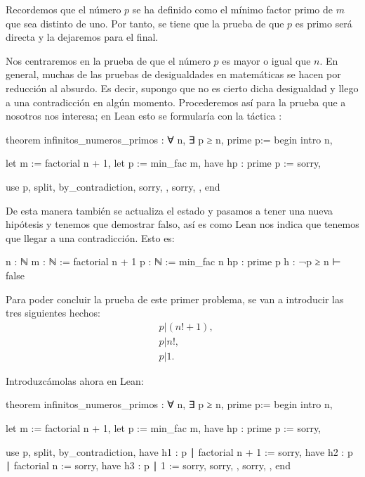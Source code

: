 Recordemos que el número \(p\) se ha definido como el mínimo factor primo de
\(m\) que sea distinto de uno. Por tanto, se tiene que la prueba de que \(p\)
es primo será directa y la dejaremos para el final.

Nos centraremos en la prueba de que el número \(p\) es mayor o igual que
\(n\). En general, muchas de las pruebas de desigualdades en
matemáticas se hacen por reducción al absurdo. Es decir, supongo que no
es cierto dicha desigualdad y llego a una contradicción en algún
momento. Procederemos así para la prueba que a nosotros nos interesa; en
Lean esto se formularía con la táctica
:
\begin{leancode}
theorem infinitos_numeros_primos : ∀ n, ∃ p ≥ n, prime p:=
begin
  intro n,

  let m := factorial n + 1,
  let p := min_fac m,
  have hp : prime p := sorry,

  use p,
  split,
  { by_contradiction,
    sorry, },
  { sorry, },
end
\end{leancode}

De esta manera también se actualiza el estado y pasamos a tener una
nueva hipótesis y tenemos que demostrar falso, así es como Lean nos
indica que tenemos que llegar a una contradicción. Esto es:
\begin{leancode}
n : ℕ
m : ℕ := factorial n + 1
p : ℕ := min_fac n
hp : prime p
h : ¬p ≥ n
⊢ false
\end{leancode}

Para poder concluir la prueba de este primer problema, se van a introducir
las tres siguientes hechos:
\begin{align}
  &p | (n!+1),\tag{h1}\label{h1intro}\\
  &p | n!,    \tag{h2}\label{h2intro}\\
  &p | 1.     \tag{h3}\label{h3intro}
\end{align}

Introduzcámolas ahora en Lean:
\begin{leancode}
theorem infinitos_numeros_primos : ∀ n, ∃ p ≥ n, prime p:=
begin
  intro n,

  let m := factorial n + 1,
  let p := min_fac m,
  have hp : prime p := sorry,

  use p,
  split,
  { by_contradiction,
    have h1 : p ∣ factorial n + 1 := sorry,
    have h2 : p ∣ factorial n := sorry,
    have h3 : p ∣ 1 := sorry,
    sorry, },
  { sorry, },
end
\end{leancode}


